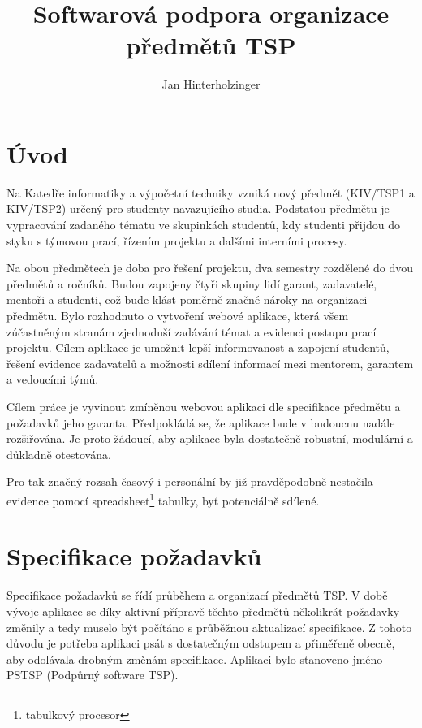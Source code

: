 \documentclass[czech,BP]{thesiskiv}
\author{Jan Hinterholzinger}
\title{Softwarová podpora organizace předmětů TSP}
\begin{document}
%
\maketitle
\tableofcontents
\chapter{Úvod}
	\par Na Katedře informatiky a výpočetní techniky vzniká nový předmět  (KIV/TSP1 a KIV/TSP2) určený pro studenty navazujícího studia. Podstatou předmětu je vypracování zadaného tématu ve skupinkách studentů, kdy studenti přijdou do styku s týmovou prací, řízením projektu a dalšími interními procesy.
	\par Na obou předmětech je doba pro řešení projektu, dva semestry rozdělené do dvou předmětů a ročníků. Budou zapojeny čtyři skupiny lidí garant, zadavatelé, mentoři a studenti, což bude klást poměrně značné nároky na organizaci předmětu. Bylo rozhodnuto o vytvoření webové aplikace, která všem zúčastněným stranám zjednoduší zadávání témat a evidenci postupu prací projektu. Cílem aplikace je umožnit lepší informovanost a zapojení studentů, řešení evidence zadavatelů a možnosti sdílení informací mezi mentorem, garantem a vedoucími týmů.
	\par Cílem práce je vyvinout zmíněnou webovou aplikaci dle specifikace předmětu a požadavků jeho garanta. Předpokládá se, že aplikace bude v budoucnu nadále rozšiřována. Je proto žádoucí, aby aplikace byla dostatečně robustní, modulární a důkladně otestována.
	\par Pro tak značný rozsah časový i personální by již pravděpodobně nestačila evidence pomocí spreadsheet\footnote{tabulkový procesor} tabulky, byť potenciálně sdílené.
\chapter{Specifikace požadavků}
\par Specifikace požadavků se řídí průběhem a organizací předmětů TSP. V době vývoje aplikace se díky aktivní přípravě těchto předmětů několikrát požadavky změnily a tedy muselo být počítáno s průběžnou aktualizací specifikace. Z tohoto důvodu je potřeba aplikaci psát s dostatečným odstupem a přiměřeně obecně, aby odolávala drobným změnám specifikace. Aplikaci bylo stanoveno jméno PSTSP (Podpůrný software TSP).
\end{document}
